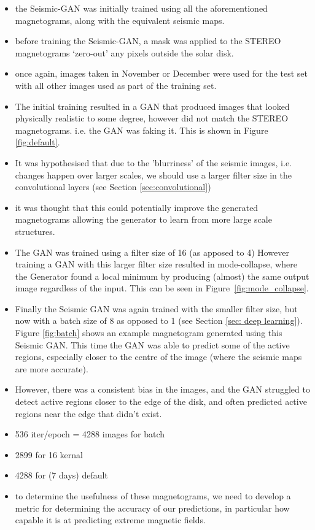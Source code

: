 \documentclass[11pt,a4paper,onecolumn]{report}
\begin{document}
\begin{itemize}
  \item the Seismic-GAN was initially trained using all the aforementioned
  magnetograms, along with the equivalent seismic maps.
  \item before training the Seismic-GAN, a mask was applied to the STEREO
  magnetograms `zero-out' any pixels outside the solar disk.
  \item once again, images taken in November or December were used for the test
  set with all other images used as part of the training set.
  
  \item The initial training resulted in a GAN that produced images that looked
  physically realistic to some degree, however did not match the STEREO
  magnetograms. i.e. the GAN was faking it. This is shown in Figure \ref{fig:default}.

  \item It was hypothesised that due to the 'blurriness' of the seismic images,
  i.e. changes happen over larger scales, we should use a larger filter size in
  the convolutional layers (see Section \ref{sec:convolutional})
  \item it was thought that this could potentially improve the generated
  magnetograms allowing the generator to learn from more large scale structures.

  \item The GAN was trained using a filter size of 16 (as apposed to 4)
  However training a GAN with this larger filter size resulted in
  mode-collapse, where the Generator found a local minimum by producing (almost)
  the same output image regardless of the input. This can be seen in
  Figure~\ref{fig:mode_collapse}.
  
  \item Finally the Seismic GAN was again trained with the smaller filter size, but now with a
  batch size of 8 as opposed to 1 (see Section \ref{sec: deep learning}). Figure
  \ref{fig:batch} shows an example magnetogram generated using this Seismic GAN.
  This time the GAN was able to predict some of the active regions, especially
  closer to the centre of the image (where the seismic maps are more accurate).
  \item However, there was a consistent bias in the images, and the GAN
  struggled to detect active regions closer to the edge of the disk, and often
  predicted active regions near the edge that didn't exist.

  \item 536 iter/epoch = 4288 images for batch
  \item 2899 for 16 kernal
  \item 4288 for (7 days) default

  \item to determine the usefulness of these magnetograms, we need to develop a
  metric for determining the accuracy of our predictions, in particular how
  capable it is at predicting extreme magnetic fields.

\end{itemize}
\end{document}
